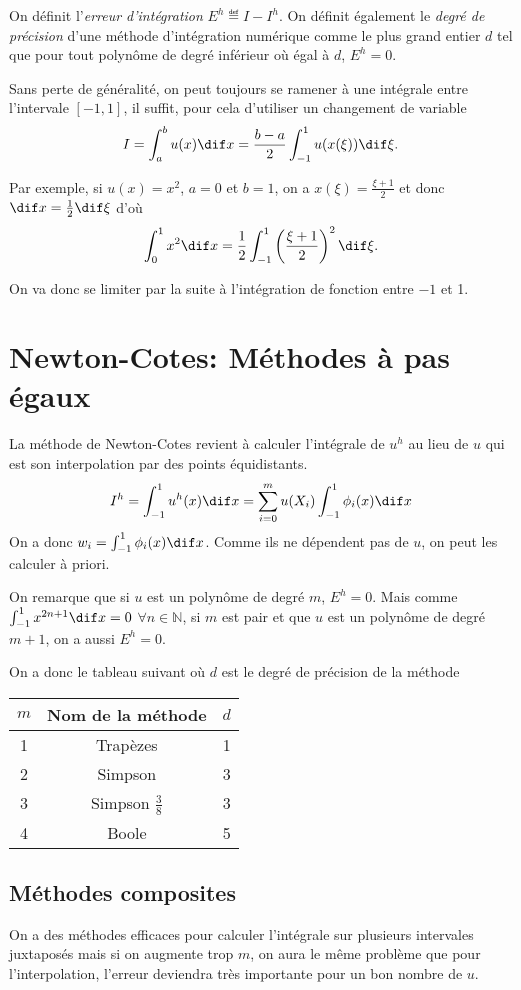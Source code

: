 On définit l'\emph{erreur d'intégration} $E^h \eqdef I - I^h$.
On définit également le \emph{degré de précision} d'une méthode d'intégration
numérique comme le plus grand entier $d$ tel que pour tout polynôme de degré
inférieur où égal à $d$, $E^h = 0$.

Sans perte de généralité, on peut toujours se ramener à une intégrale
entre l'intervale $[-1, 1]$, il suffit, pour cela d'utiliser un changement
de variable
\[ I = \int_a^b u(x) \dif x =
\frac{b-a}{2} \int_{-1}^1 u(x(\xi)) \dif \xi. \]

Par exemple, si $u(x) = x^2$, $a = 0$ et $b = 1$,
on a $x(\xi) = \frac{\xi+1}{2}$ et donc $\dif x = \frac{1}{2}\dif \xi$ d'où
\[ \int_0^1 x^2 \dif x =
\frac{1}{2}\int_{-1}^1 \left(\frac{\xi+1}{2}\right)^2 \dif \xi. \]

On va donc se limiter par la suite à l'intégration de fonction entre $-1$ et 1.

\section{Newton-Cotes: Méthodes à pas égaux}
La méthode de Newton-Cotes revient à calculer l'intégrale de $u^h$ au lieu
de $u$ qui est son interpolation par des points équidistants.
\[ I^h = \int_{-1}^1 u^h(x) \dif x =
\sum_{i=0}^m u(X_i) \int_{-1}^1 \phi_i(x) \dif x \]
On a donc $w_i = \int_{-1}^1 \phi_i(x) \dif x$.
Comme ils ne dépendent pas de $u$, on peut les calculer à priori.

On remarque que si $u$ est un polynôme de degré $m$, $E^h = 0$.
Mais comme $\int_{-1}^1 x^{2n+1} \dif x = 0$ $\forall n \in \mathbb{N}$,
si $m$ est pair et que $u$ est un polynôme de degré $m+1$,
on a aussi $E^h = 0$.

On a donc le tableau suivant où $d$ est le degré de précision de la méthode
\begin{center}
  \begin{tabular}{|c|c|c|}
    \hline
    $m$ & Nom de la méthode & $d$\\
    \hline
    1 & Trapèzes & 1\\
    2 & Simpson & 3\\
    3 & Simpson $\frac{3}{8}$ & 3\\
    4 & Boole & 5\\
    \hline
  \end{tabular}
\end{center}

\subsection{Méthodes composites}
On a des méthodes efficaces pour calculer l'intégrale sur plusieurs
intervales juxtaposés mais si on augmente trop $m$, on aura le même problème
que pour l'interpolation, l'erreur deviendra très importante pour un bon
nombre de $u$.

